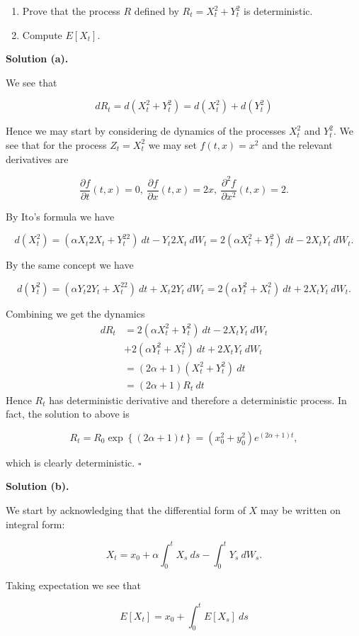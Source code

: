\documentclass[a4paper,12pt,openany]{book}
\providecommand{\tightlist}{%
 \setlength{\itemsep}{0pt}\setlength{\parskip}{0pt}}
\begin{document}
\begin{enumerate}
\def\labelenumi{\alph{enumi}.}
\tightlist
\item
  Prove that the process \(R\) defined by \(R_t=X_t^2+Y_t^2\) is deterministic.
\item
  Compute \(E[X_t]\).
\end{enumerate}

\textbf{Solution (a).}

We see that

\[
dR_t=d(X_t^2+Y_t^2)=d(X_t^2)+d(Y_t^2)
\]

Hence we may start by considering de dynamics of the processes \(X_t^2\) and \(Y_t^2\). We see that for the process \(Z_t=X_t^2\) we may set \(f(t,x)=x^2\) and the relevant derivatives are

\[
\frac{\partial f}{\partial t}(t,x)=0,\ \frac{\partial f}{\partial x}(t,x)=2x,\ \frac{\partial^2 f}{\partial x^2}(t,x)=2.
\]

By Ito's formula we have

\[
d(X_t^2)=\left(\alpha X_t2X_t+Y_t^22\right)\ dt-Y_t2X_t\ dW_t=2(\alpha X_t^2+Y_t^2)\ dt-2X_tY_t\ dW_t.
\]

By the same concept we have

\[
d(Y_t^2)=\left(\alpha Y_t2Y_t+X_t^22\right)\ dt+X_t2Y_t\ dW_t=2(\alpha Y_t^2+X_t^2)\ dt+2X_tY_t\ dW_t.
\]

Combining we get the dynamics
\begin{align*}
dR_t&=2(\alpha X_t^2+Y_t^2)\ dt-2X_tY_t\ dW_t\\
&+2(\alpha Y_t^2+X_t^2)\ dt+2X_tY_t\ dW_t\\
&=(2\alpha +1)(X_t^2 + Y_t^2)\ dt\\
&=(2\alpha +1)R_t\ dt
\end{align*}
Hence \(R_t\) has deterministic derivative and therefore a deterministic process. In fact, the solution to above is

\[
R_t=R_0\exp\left\{(2\alpha + 1)t\right\}=(x_0^2+y_0^2)e^{(2\alpha + 1)t},
\]

which is clearly deterministic. \(\square\)

\textbf{Solution (b).}

We start by acknowledging that the differential form of \(X\) may be written on integral form:

\[
X_t=x_0+\alpha\int_0^tX_s\ ds-\int_0^tY_s\ dW_s.
\]

Taking expectation we see that

\[
E[X_t]=x_0+\int_0^tE[X_s]\ ds
\]
\end{document}
